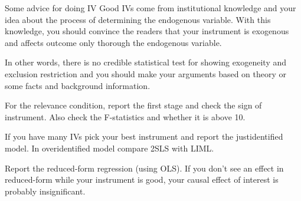 \documentclass{beamer}
\begin{document}
\begin{frame}{Some advice for doing IV}
Good IVs come from institutional knowledge and your idea about the process of determining the endogenous variable. With this knowledge,
you should convince the readers that your instrument is exogenous and affects outcome only thorough the endogenous variable. \medskip

In other words, there is no credible statistical test for showing exogeneity and exclusion restriction and you should make your arguments based on theory or some facts and background information.\medskip

For the relevance condition, report the first stage and check the sign of instrument. Also check the F-statistics and whether it is above 10. \medskip 

If you have many IVs pick your best instrument and report the justidentified model. In overidentified model compare 2SLS with LIML.\medskip

Report the reduced-form regression (using OLS). If you don't see an effect in reduced-form while your instrument is good, your causal effect of interest is probably insignificant. 
\end{frame}


%
%
\end{document}

